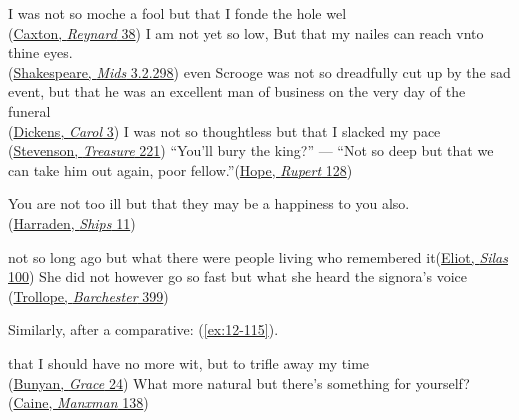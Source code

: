 \ea \label{ex:12-102a}
\ea
I was not so moche a fool but that I fonde the hole wel\\\hfill(\href{https://archive.org/details/TheHistoryOfReynardTheFoxArber/page/n67/mode/2up?q=%22moche+a+fool+but%22&view=theater}{Caxton, \textit{Reynard} 38}) %
\ex
I am not yet so low, But that my nailes can reach vnto thine eyes.\\\hfill(\href{https://internetshakespeare.uvic.ca/doc/MND_F1/scene/3.2/index.html#tln-1330}{Shakespeare, \textit{Mids} 3.2.298})
\ex
even Scrooge was not so dreadfully cut up by the sad event, but that he was an excellent man of business on the very day of the funeral\\\hfill(\href{https://archive.org/details/christmascarol0000char_h5c8/page/14/mode/2up?q=%22man+of+business%22&view=theater}{Dickens, \textit{Carol} 3}) %
\ex
I was not so thoughtless but that I slacked my pace\\\hfill(\href{https://archive.org/details/treasureisl00stev/page/226/mode/2up?q=%22was+not+so+thoughtless+but%22&view=theater}{Stevenson, \textit{Treasure} 221})
\ex
``You'll bury the king?'' --- ``Not so deep but that we can take him out again, poor fellow.''\hfill(\href{https://archive.org/details/in.ernet.dli.2015.53170/page/n167/mode/2up?q=%22bury+the+king%22&view=theater}{Hope, \textit{Rupert} 128}) %

\ex
You are not too ill but that they may be a happiness to you also.\\\hfill(\href{https://archive.org/details/shipsthatpassin00harr/page/12/mode/2up?view=theater&q=%22you+are+not+too+ill%22}{Harraden, \textit{Ships} 11}) %
\z
\z

\ea \label{ex:12-102b}
\ea
not so long ago but what there were people living who remembered it\hfill(\href{https://archive.org/details/silasmarnerbygeo00elio/page/68/mode/2up?q=%22Not+so+long+ago+but+what%22&view=theater}{Eliot, \textit{Silas} 100})
\ex
She did not however go so fast but what she heard the signora's voice\\\hfill(\href{https://archive.org/details/barchestertowers0000anth_w2h4/page/362/mode/2up?q=%22she+did+not+however+go%22&view=theater}{Trollope, \textit{Barchester} 399})
\z
\z

Similarly, after a comparative: (\ref{ex:12-115}).

\ea \label{ex:12-115}
\ea
that I should have no more wit, but to trifle away my time\\\hfill(\href{https://archive.org/details/graceaboundingto00buny/page/36/mode/2up?q=%22trifle+away+my+time%22&view=theater}{Bunyan, \textit{Grace} 24})
\ex
What more natural but there's something for yourself?\\\hfill(\href{https://archive.org/details/manxman00cain/page/138/mode/2up?q=%22more+natural%22&view=theater}{Caine, \textit{Manxman} 138})
\z
\z

